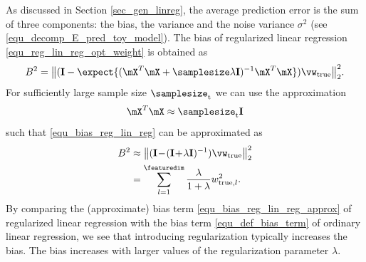 \documentclass[12pt]{report}
\begin{document}
As discussed in Section \ref{sec_gen_linreg}, the average prediction 
error is the sum of three components: the bias, the variance and the 
noise variance $\sigma^{2}$ (see \eqref{equ_decomp_E_pred_toy_model}). 
The bias of regularized linear regression \eqref{equ_reg_lin_reg_opt_weight} 
is obtained as 
\begin{equation} 
\label{equ_bias_reg_lin_reg}
B^{2} = \big \| (\mathbf{I} - \expect \{ ( \mX^{T} \mX +  \samplesize \lambda \mathbf{I})^{-1} \mX^{T} \mX  \})  \vw_{\rm true} \big  \|^{2}_{2}. 
\end{equation} 
For sufficiently large sample size $\samplesize_{\rm t}$ we can use the approximation 
\begin{equation} 
\label{equ_approx_Gram_large_N}
\mX^{T} \mX  \approx \samplesize_{\rm t} \mathbf{I} 
\end{equation} 
such that \eqref{equ_bias_reg_lin_reg} can be approximated as 
 \begin{align} 
\label{equ_bias_reg_lin_reg_approx}
B^{2} & \approx \big \| (\mathbf{I}\!-\!(\mathbf{I}\!+\!\lambda \mathbf{I})^{-1} ) \vw_{\rm true} \big  \|^{2}_{2} \nonumber \\
& =  \sum_{l=1}^{\featuredim} \frac{\lambda}{1+\lambda} w_{{\rm true},l}^2 .
\end{align} 
By comparing the (approximate) bias term \eqref{equ_bias_reg_lin_reg_approx} 
of regularized linear regression with the bias term \eqref{equ_def_bias_term} of 
ordinary linear regression, we see that introducing regularization typically 
increases the bias. The bias increases with larger values of the regularization 
parameter $\lambda$. 
\end{document}
